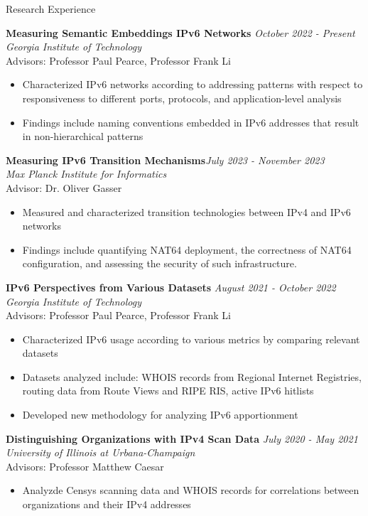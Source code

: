 \documentclass{resume} %
\begin{document}
	\begin{rSection}{Research Experience}
		
		{\bf Measuring Semantic Embeddings IPv6 Networks} \hfill{\em October 2022 - Present}\\
		{\em Georgia Institute of Technology}\\
		{Advisors: Professor Paul Pearce, Professor Frank Li}
		\begin{itemize}
			\item Characterized IPv6 networks according to addressing patterns with respect to responsiveness to different ports, protocols, and application-level analysis
			\item Findings include naming conventions embedded in IPv6 addresses that result in non-hierarchical patterns
		\end{itemize}
		
		{\bf Measuring IPv6 Transition Mechanisms}\hfill{\em July 2023 - November 2023}\\
		{\em Max Planck Institute for Informatics}\\
		{Advisor: Dr. Oliver Gasser}
		\begin{itemize}
			\item Measured and characterized transition technologies between IPv4 and IPv6 networks
			\item Findings include quantifying NAT64 deployment, the correctness of NAT64 configuration, and assessing the security of such infrastructure.
		\end{itemize}
		
		{\bf IPv6 Perspectives from Various Datasets} \hfill{\em August 2021 - October 2022}\\
		{\em Georgia Institute of Technology}\\
		{Advisors: Professor Paul Pearce, Professor Frank Li}
		\begin{itemize}
			\item Characterized IPv6 usage according to various metrics by comparing relevant datasets
			\item Datasets analyzed include: WHOIS records from Regional Internet Registries, routing data from Route Views and RIPE RIS, active IPv6 hitlists
			\item Developed new methodology for analyzing IPv6 apportionment
		\end{itemize}
		
		{\bf Distinguishing Organizations with IPv4 Scan Data} \hfill{\em July 2020 - May 2021}\\
		{\em University of Illinois at Urbana-Champaign}\\
		{Advisors: Professor Matthew Caesar}
		\begin{itemize}
			\item Analyzde Censys scanning data and WHOIS records for correlations between organizations and their IPv4 addresses
		\end{itemize}
		

\end{rSection}
\end{document}
